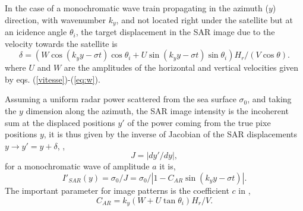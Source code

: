 In the case of a monochromatic wave train propagating in the azimuth ($y$) direction, with wavenumber $k_y$, and not located right under the satellite but at an icidence angle $\theta_i$, 
the target displacement in the SAR image due to the velocity towards the satellite is 
\begin{equation}
 \delta = \left ( W \cos (k_y  y - \sigma t) \cos \theta_i  + U \sin (k_y  y - \sigma t) \sin  \theta_i  \right) H_r/(V \cos \theta). \label{eq:delA}
\end{equation}
where $U$ and $W$ are the amplitudes of the horizontal and vertical velocities given by eqs. (\ref{vitesse})-(\ref{eq:w}). 

Assuming a uniform radar power scattered from the sea surface $\sigma_0$, and taking the $y$ dimension  along the azimuth, 
the SAR image intensity is the incoherent sum at the displaced positions $y'$ of the power coming from the true pixe positions $y$, it is thus given by the inverse of Jacobian of the SAR displacements 
$y \rightarrow y'=y+\delta$, \citep[see eq. 21  in][]{Hasselmann&Hasselmann1991}, 
\begin{equation}
 J = \left|dy'/dy\right|,
\end{equation}
for a monochromatic wave of amplitude $a$ it is, 
\begin{equation}
I'_{SAR}(y) = \sigma_0/J = \sigma_0 / \left|1 -  C_{AR}  \sin( k_y y- \sigma t) \right|\label{ISAR}.
\end{equation}
The important parameter for image patterns is the coefficient $c$ in \cite{Alpers&Rufenach1979}, 
\begin{equation}
  C_{AR}=k_y (W + U \tan \theta_i) H_r/V.\label{eq:CAR_def}
\end{equation}


